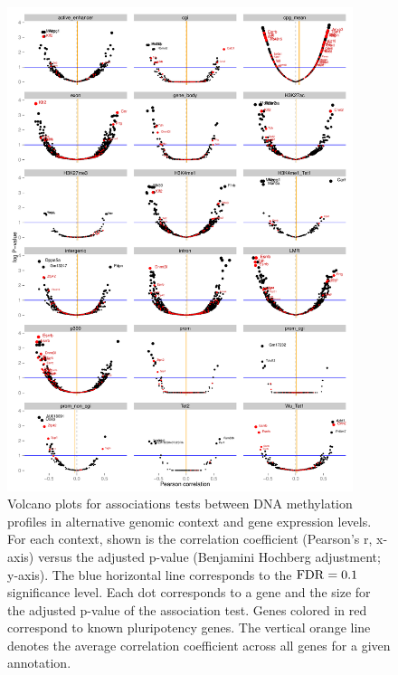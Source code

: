 \begin{figure}[htbp!]
\centering
\includegraphics[width=0.9\textwidth]{gene_volcano_all}
\caption[Volcano plots for associations tests between DNA methylation profiles in alternative genomic context and gene expression levels.]{Volcano plots for associations tests between DNA methylation profiles in alternative genomic context and gene expression levels. For each context, shown is the correlation coefficient (Pearson's r, x-axis) versus the adjusted p-value (Benjamini Hochberg adjustment; y-axis). The blue horizontal line corresponds to the $\operatorname{FDR}=0.1$ significance level. Each dot corresponds to a gene and the size for the adjusted p-value of the association test. Genes colored in red correspond to known pluripotency genes. The vertical orange line denotes the average correlation coefficient across all genes for a given annotation.}
\label{fig:mt_gene_volcano_all}
\end{figure}

